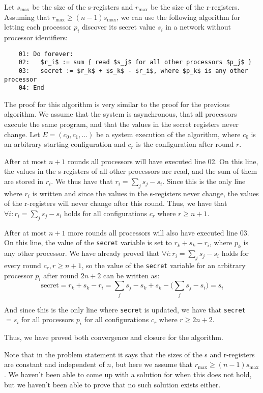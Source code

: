 \documentclass{article}
\begin{document}
Let $s_{\max}$ be the size of the s-registers and $r_{\max}$ be the size of the r-registers. Assuming that $r_{\max} \geq (n-1) s_{\max}$, we can use the following algorithm for letting each processor $p_i$ discover its secret value $s_i$ in a network without processor identifiers:

\begin{lstlisting}
    01: Do forever:
    02:   $r_i$ := sum { read $s_j$ for all other processors $p_j$ }
    03:   secret := $r_k$ + $s_k$ - $r_i$, where $p_k$ is any other processor
    04: End
\end{lstlisting}

The proof for this algorithm is very similar to the proof for the previous algorithm. We assume that the system is asynchronous, that all processors execute the same program, and that the values in the secret registers never change. Let $E = (c_0, c_1, \ldots)$ be a system execution of the algorithm, where $c_0$ is an arbitrary starting configuration and $c_r$ is the configuration after round $r$.

After at most $n + 1$ rounds all processors will have executed line 02. On this line, the values in the s-registers of all other processors are read, and the sum of them are stored in $r_i$. We thus have that $r_i = \sum_j s_j - s_i$. Since this is the only line where $r_i$ is written and since the values in the s-registers never change, the values of the r-registers will never change after this round. Thus, we have that $\forall i : r_i = \sum_j s_j - s_i$ holds for all configurations $c_r$ where $r \geq n + 1$.

After at most $n + 1$ more rounds all processors will also have executed line 03. On this line, the value of the \verb|secret| variable is set to $r_k + s_k - r_i$, where $p_k$ is any other processor. We have already proved that $\forall i : r_i = \sum_j s_j - s_i$ holds for every round $c_r, r \geq n + 1$, so the value of the \verb|secret| variable for an arbitrary processor $p_i$ after round $2n + 2$ can be written as:
$$
    \text{secret} = r_k + s_k - r_i = \sum_j s_j - s_k + s_k - \Big(\sum_j s_j - s_i\Big) = s_i
$$

And since this is the only line where \verb|secret| is updated, we have that \verb|secret| $ = s_i$ for all processors $p_i$ for all configurations $c_r$ where $r \geq 2n + 2$.

Thus, we have proved both convergence and closure for the algorithm.

Note that in the problem statement it says that the sizes of the s and r-registers are constant and independent of $n$, but here we assume that $r_{\max} \geq (n-1) s_{\max}$. We haven't been able to come up with a solution for when this does not hold, but we haven't been able to prove that no such solution exists either.
\end{document}
